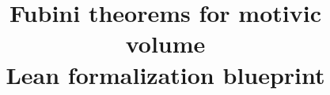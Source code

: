 \theoremstyle{definition}
\newtheorem{theorem}{Theorem}
\newtheorem{definition}[theorem]{Definition}
\newtheorem{lemma}[theorem]{Lemma}
\newtheorem{proposition}[theorem]{Proposition}
\newtheorem{corollary}[theorem]{Corollary}
\newtheorem{remark}[theorem]{Remark}
\newtheorem{assumption}[theorem]{External hypothesis}
\newtheorem{checkedimport}[theorem]{Checked Lean import}
\newcommand{\rv}{\operatorname{rv}}
\newcommand{\repoFile}[2]{\href{https://github.com/daviddhilbert/Fubini-theorems/blob/5b547c1ab198c59ca380993afb3a779579696a80/#1}{#2}}
\title{Fubini theorems for motivic volume\\\large Lean formalization blueprint}
\author{}
\date{}

